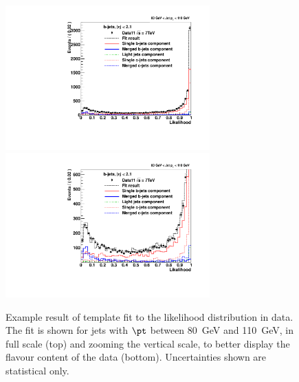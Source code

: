 \begin{figure}[tp]
\centering
\includegraphics[width=0.7\textwidth]{FIGS/Fits/LikelihoodFit_3param_ETAFull_Bin2.pdf}
\includegraphics[width=0.7\textwidth]{FIGS/Fits/LikelihoodFit_3param_ETAFull_ZOOM_Bin2.pdf}
\caption{Example result of template fit to the likelihood distribution in data. The fit is shown for jets with $\pt$ between  80~GeV and 110~GeV, in full scale (top) and zooming the vertical scale, to better display the flavour content of the data (bottom). Uncertainties shown are statistical only.}
\label{fig:fittemplates1}
\end{figure}

